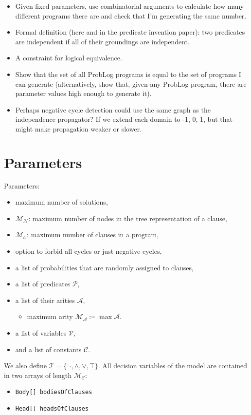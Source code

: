 \documentclass[runningheads]{llncs}
\newcommand{\variable}[1]{\texttt{\textup{#1}}}
\newcommand{\predicates}{\mathcal{P}}
\newcommand{\variables}{\mathcal{V}}
\newcommand{\constants}{\mathcal{C}}
\newcommand{\tokens}{\mathcal{T}}
\newcommand{\arities}{\mathcal{A}}
\newcommand{\maxArity}{\mathcal{M}_{\mathcal{A}}}
\newcommand{\maxNumNodes}{\mathcal{M}_{\mathcal{N}}}
\newcommand{\maxNumClauses}{\mathcal{M}_{\mathcal{C}}}
\begin{document}
\begin{itemize}
\item Given fixed parameters, use combinatorial arguments to calculate how many
  different programs there are and check that I'm generating the same number.
\item Formal definition (here and in the predicate invention paper): two
  predicates are independent if all of their groundings are independent.
\item A constraint for logical equivalence.
\item Show that the set of all ProbLog programs is equal to the set of programs
  I can generate (alternatively, show that, given any ProbLog program, there are
  parameter values high enough to generate it).
\item Perhaps negative cycle detection could use the same graph as the
  independence propagator? If we extend each domain to {-1, 0, 1}, but that
  might make propagation weaker or slower.
\end{itemize}

\section{Parameters}

Parameters:
\begin{itemize}
\item maximum number of solutions,
\item $\maxNumNodes{}$: maximum number of nodes in the tree representation of a
  clause,
\item $\maxNumClauses{}$: maximum number of clauses in a program,
\item option to forbid all cycles or just negative cycles,
\item a list of probabilities that are randomly assigned to clauses,
\item a list of predicates $\predicates{}$,
\item a list of their arities $\arities{}$,
  \begin{itemize}
  \item maximum arity $\maxArity{} \coloneqq \max \arities{}$.
  \end{itemize}
\item a list of variables $\variables{}$,
\item and a list of constants $\constants{}$.
\end{itemize}

We also define $\tokens{} = \{ \neg, \land, \lor, \top \}$. All decision
variables of the model are contained in two arrays of length $\maxNumClauses{}$:
\begin{itemize}
\item \variable{Body[] bodiesOfClauses}
\item \variable{Head[] headsOfClauses}
\end{itemize}
\end{document}
